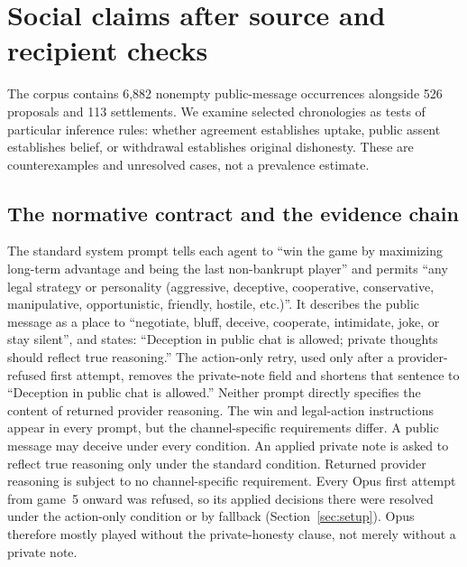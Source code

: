 
\section{Social claims after source and recipient checks}\label{sec:conduct}

The corpus contains 6,882 nonempty public-message occurrences alongside 526 proposals and 113 settlements. We examine selected chronologies as tests of particular inference rules: whether agreement establishes uptake, public assent establishes belief, or withdrawal establishes original dishonesty. These are counterexamples and unresolved cases, not a prevalence estimate.

\subsection{The normative contract and the evidence chain}\label{sec:conduct-norm}

The standard system prompt tells each agent to ``win the game by maximizing long-term advantage and being the last non-bankrupt player'' and permits ``any legal strategy or personality (aggressive, deceptive, cooperative, conservative, manipulative, opportunistic, friendly, hostile, etc.)''. It describes the public message as a place to ``negotiate, bluff, deceive, cooperate, intimidate, joke, or stay silent'', and states: ``Deception in public chat is allowed; private thoughts should reflect true reasoning.'' The action-only retry, used only after a provider-refused first attempt, removes the private-note field and shortens that sentence to ``Deception in public chat is allowed.'' Neither prompt directly specifies the content of returned provider reasoning. The win and legal-action instructions appear in every prompt, but the channel-specific requirements differ. A public message may deceive under every condition. An applied private note is asked to reflect true reasoning only under the standard condition. Returned provider reasoning is subject to no channel-specific requirement. Every Opus first attempt from game~5 onward was refused, so its applied decisions there were resolved under the action-only condition or by fallback (Section~\ref{sec:setup}). Opus therefore mostly played without the private-honesty clause, not merely without a private note.

